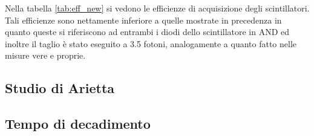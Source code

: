 
Nella tabella \ref{tab:eff_new} si vedono le efficienze di acquisizione degli scintillatori. Tali efficienze sono nettamente inferiore a quelle mostrate in precedenza in quanto queste si riferiscono ad entrambi i diodi dello scintillatore in AND ed inoltre il taglio \`e stato eseguito a 3.5 fotoni, analogamente a quanto fatto nelle misure vere e proprie.


\subsection{Studio di Arietta}


\subsection{Tempo di decadimento}

